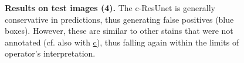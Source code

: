 \begin{figure}[ht]\ContinuedFloat
\centering
{}
\caption{\textbf{Results on test images (4).}
The c-ResUnet is generally conservative in predictions, thus generating false positives (blue boxes).
However, these are similar to other stains that were not annotated (cf. also with \hyperref[fig:predictions:false-positives]{c}), thus falling again within the limits of operator's interpretation.
} 
\end{figure}













